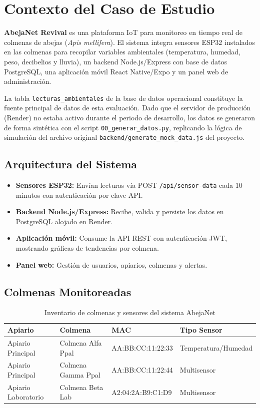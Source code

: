 \section{Contexto del Caso de Estudio}

\textbf{AbejaNet Revival} es una plataforma IoT para monitoreo en tiempo real de colmenas
de abejas (\textit{Apis mellifera}). El sistema integra sensores ESP32 instalados en las
colmenas para recopilar variables ambientales (temperatura, humedad, peso, decibelios y
lluvia), un backend Node.js/Express con base de datos PostgreSQL, una aplicaci\'on m\'ovil
React Native/Expo y un panel web de administraci\'on.

La tabla \texttt{lecturas\_ambientales} de la base de datos operacional constituye la
fuente principal de datos de esta evaluaci\'on. Dado que el servidor de producci\'on
(Render) no estaba activo durante el periodo de desarrollo, los datos se generaron de forma
sint\'etica con el script \texttt{00\_generar\_datos.py}, replicando la l\'ogica de
simulaci\'on del archivo original \texttt{backend/generate\_mock\_data.js} del proyecto.

\subsection{Arquitectura del Sistema}

\begin{itemize}\setlength{\itemsep}{2pt}
  \item \textbf{Sensores ESP32:} Env\'ian lecturas v\'ia POST \texttt{/api/sensor-data}
        cada 10 minutos con autenticaci\'on por clave API.
  \item \textbf{Backend Node.js/Express:} Recibe, valida y persiste los datos en
        PostgreSQL alojado en Render.
  \item \textbf{Aplicaci\'on m\'ovil:} Consume la API REST con autenticaci\'on JWT,
        mostrando gr\'aficas de tendencias por colmena.
  \item \textbf{Panel web:} Gesti\'on de usuarios, apiarios, colmenas y alertas.
\end{itemize}

\subsection{Colmenas Monitoreadas}

\begin{table}[h!]
  \centering
  \begin{tabular}{llll}
    \toprule
    \textbf{Apiario} & \textbf{Colmena} & \textbf{MAC} & \textbf{Tipo Sensor} \\
    \midrule
    Apiario Principal   & Colmena Alfa Ppal  & AA:BB:CC:11:22:33 & Temperatura/Humedad \\
    Apiario Principal   & Colmena Gamma Ppal & AA:BB:CC:11:22:44 & Multisensor \\
    Apiario Laboratorio & Colmena Beta Lab   & A2:04:2A:B9:C1:D9 & Multisensor \\
    \bottomrule
  \end{tabular}
  \caption{Inventario de colmenas y sensores del sistema AbejaNet}
\end{table}
